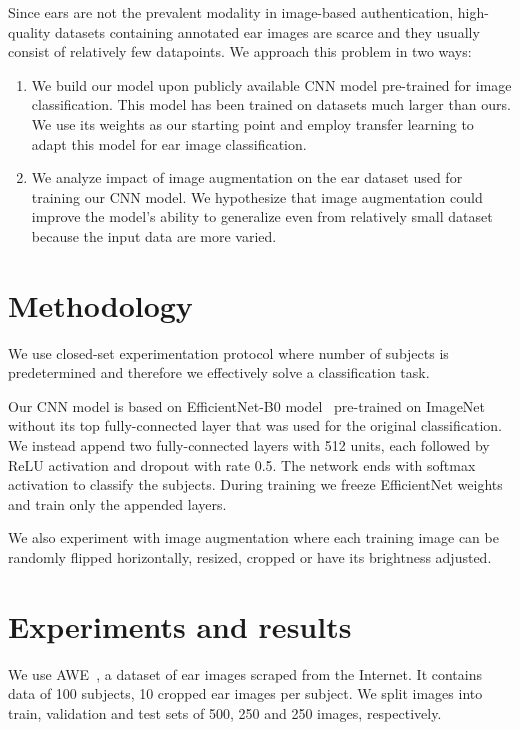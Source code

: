 \documentclass[9pt]{IEEEtran}
\begin{document}
Since ears are not the prevalent modality in image-based authentication, high-quality datasets containing annotated ear images are scarce and they usually consist of relatively few datapoints.
We approach this problem in two ways:
\begin{enumerate}
    \item We build our model upon publicly available CNN model pre-trained for image classification.
          This model has been trained on datasets much larger than ours.
          We use its weights as our starting point and employ transfer learning to adapt this model for ear image classification.
    \item We analyze impact of image augmentation on the ear dataset used for training our CNN model.
          We hypothesize that image augmentation could improve the model's ability to generalize even from relatively small dataset because the input data are more varied.
\end{enumerate}

\section{Methodology}\label{sec:meth}

We use closed-set experimentation protocol where number of subjects is predetermined and therefore we effectively solve a classification task.

Our CNN model is based on EfficientNet-B0 model~\cite{efficientNet} pre-trained on ImageNet~\cite{imageNet} without its top fully-connected layer that was used for the original classification.
We instead append two fully-connected layers with 512 units, each followed by ReLU activation and dropout with rate 0.5.
The network ends with softmax activation to classify the subjects.
During training we freeze EfficientNet weights and train only the appended layers.

We also experiment with image augmentation where each training image can be randomly flipped horizontally, resized, cropped or have its brightness adjusted.

\section{Experiments and results}

We use AWE~\cite{emersic2017ear}, a dataset of ear images scraped from the Internet.
It contains data of 100 subjects, 10 cropped ear images per subject.
We split images into train, validation and test sets of 500, 250 and 250 images, respectively.
\end{document}
